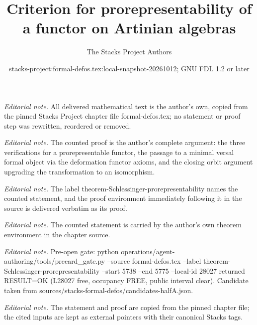 \documentclass[10pt,a4paper]{amsart}
\title{Criterion for prorepresentability of a functor on Artinian algebras}
\author{The Stacks Project Authors}
\date{stacks-project:formal-defos.tex:local-snapshot-20261012; GNU FDL 1.2 or later}
\theoremstyle{plain}
\theoremstyle{definition}
\theoremstyle{remark}
\numberwithin{equation}{subsection}
\begin{document}
\maketitle
\noindent\textit{Editorial note.} All delivered mathematical text is the author's own, copied from the pinned Stacks Project chapter file formal-defos.tex; no statement or proof step was rewritten, reordered or removed.\par\medskip
\noindent\textit{Editorial note.} The counted proof is the author's complete argument: the three verifications for a prorepresentable functor, the passage to a minimal versal formal object via the deformation functor axioms, and the closing orbit argument upgrading the transformation to an isomorphism.\par\medskip
\noindent\textit{Editorial note.} The label theorem-Schlessinger-prorepresentability names the counted statement, and the proof environment immediately following it in the source is delivered verbatim as its proof.\par\medskip
\noindent\textit{Editorial note.} The counted statement is carried by the author's own theorem environment in the chapter source.\par\medskip
\noindent\textit{Editorial note.} Pre-open gate: python operations/agent-authoring/tools/precard\_gate.py --source formal-defos.tex --label theorem-Schlessinger-prorepresentability --start 5738 --end 5775 --local-id 28027 returned RESULT=OK (L28027 free, occupancy FREE, public interval clear). Candidate taken from sources/stacks-formal-defos/candidates-halfA.json.\par\medskip
\noindent\textit{Editorial note.} The statement and proof are copied from the pinned chapter file; the cited inputs are kept as external pointers with their canonical Stacks tags.\par\medskip
\end{document}
